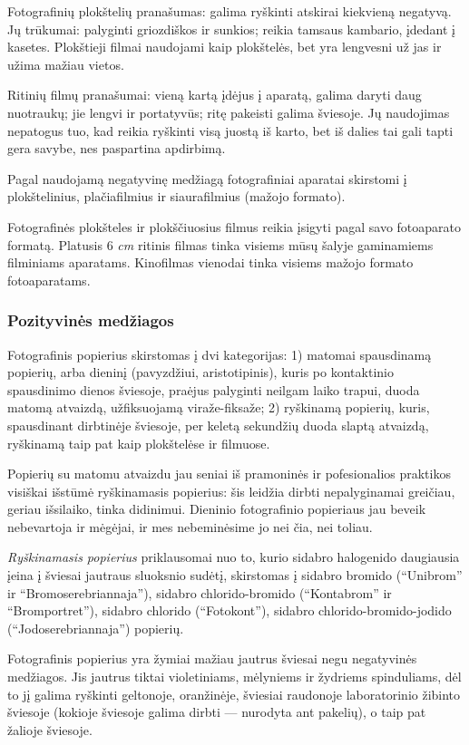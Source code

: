 \documentclass{book}
\begin{document}
					Fotografinių plokštelių pranašumas: galima ryškinti atskirai kiekvieną negatyvą. Jų trūkumai: palyginti griozdiškos ir sunkios; reikia tamsaus kambario, įdedant į kasetes. Plokštieji filmai naudojami kaip plokštelės, bet yra lengvesni už jas ir užima mažiau vietos.

					Ritinių filmų pranašumai: vieną kartą įdėjus į aparatą, galima daryti daug nuotraukų; jie lengvi ir portatyvūs; ritę pakeisti galima šviesoje. Jų naudojimas nepatogus tuo, kad reikia ryškinti visą juostą iš karto, bet iš dalies tai gali tapti gera savybe, nes paspartina apdirbimą.

					Pagal naudojamą negatyvinę medžiagą fotografiniai aparatai skirstomi į plokštelinius, plačiafilmius ir siaurafilmius (mažojo formato).

					Fotografinės plokšteles ir plokščiuosius filmus reikia įsigyti pagal savo fotoaparato formatą. Platusis 6 \textit{cm} ritinis filmas tinka visiems mūsų šalyje gaminamiems filminiams aparatams. Kinofilmas vienodai tinka visiems mažojo formato fotoaparatams.
				\subsubsection*{Pozityvinės medžiagos}
					Fotografinis popierius skirstomas į dvi kategorijas: 1) matomai spausdinamą popierių, arba dieninį (pavyzdžiui, aristotipinis), kuris po kontaktinio spausdinimo dienos šviesoje, praėjus palyginti neilgam laiko trapui, duoda matomą atvaizdą, užfiksuojamą viraže-fiksaže; 2) ryškinamą popierių, kuris, spausdinant dirbtinėje šviesoje, per keletą sekundžių duoda slaptą atvaizdą, ryškinamą taip pat kaip plokštelėse ir filmuose.

					Popierių su matomu atvaizdu jau seniai iš pramoninės ir pofesionalios praktikos visiškai išstūmė ryškinamasis popierius: šis leidžia dirbti nepalyginamai greičiau, geriau išsilaiko, tinka didinimui. Dieninio fotografinio popieriaus jau beveik nebevartoja ir mėgėjai, ir mes nebeminėsime jo nei čia, nei toliau.

					\textit{Ryškinamasis popierius} priklausomai nuo to, kurio sidabro halogenido daugiausia įeina į šviesai jautraus sluoksnio sudėtį, skirstomas į sidabro bromido (``Unibrom'' ir ``Bromoserebriannaja''), sidabro chlorido-bromido (``Kontabrom'' ir ``Bromportret''), sidabro chlorido (``Fotokont''), sidabro chlorido-bromido-jodido (``Jodoserebriannaja'') popierių.

					Fotografinis popierius yra žymiai mažiau jautrus šviesai negu negatyvinės medžiagos. Jis jautrus tiktai violetiniams, mėlyniems ir žydriems spinduliams, dėl to jį galima ryškinti geltonoje, oranžinėje, šviesiai raudonoje laboratorinio žibinto šviesoje (kokioje šviesoje galima dirbti --- nurodyta ant pakelių), o taip pat žalioje šviesoje.
\end{document}
